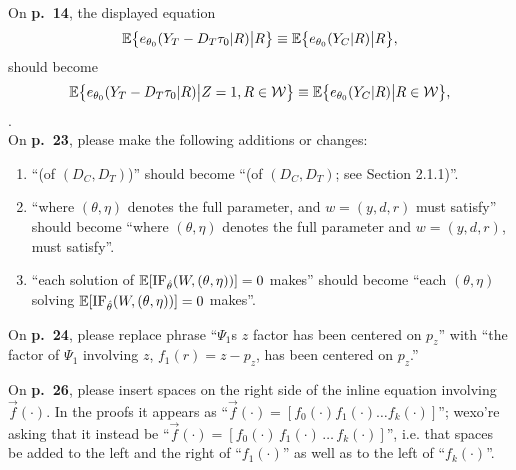 \documentclass[12pt]{article}
\begin{document}
On \textbf{p.~14}, the displayed equation  
\begin{equation*} %
\EE \big\{\dt[\thetaInf]{Y_T-D_T\tau_0}{ R } \big| R \big\}
\equiv \EE \big\{ \dt[\thetaInf]{Y_{C}}{ R } \big| R \big\},
\end{equation*}
should become 
\begin{equation*} %
\EE \big\{\dt[\thetaInf]{Y_T-D_T\tau_0}{ R } \big| Z=1, R \in \mathcal{W}\big\}
\equiv \EE \big\{ \dt[\thetaInf]{Y_{C}}{ R } \big| R \in \mathcal{W} \big\},
\end{equation*}
.\\

On \textbf{p.~23}, please make the following additions or changes:
\begin{enumerate}
\item ``(of $(D_C, D_T)$)'' should become ``(of $(D_C, D_T)$; see
  Section 2.1.1)''.
\item ``where $(\theta, \eta)$ denotes the full parameter, and $w =
({y},d,r)$ must satisfy'' should become ``where $(\theta, \eta)$
denotes the full parameter and $w = ({y},d,r)$, must satisfy''.
\item ``each solution of $\mathbb{E}[\mathrm{IF}_{\hat\theta}(W, (\theta, \eta))] =0$ makes''
  should become ``each $(\theta, \eta)$ solving $\mathbb{E}[\mathrm{IF}_{\hat\theta}(W, (\theta, \eta))] =0$
  makes''. 
\end{enumerate}

On \textbf{p.~24}, please replace phrase
   ``$\Psi_1$s $z$ factor has been centered on $p_z$''  with ``the factor of $\Psi_1$ involving $z$,
   $f_1(r) = z - p_{z}$, has been centered on $p_z$.''

On \textbf{p.~26}, please insert spaces on the right side of the
inline equation involving $\vec{f}(\cdot)$.  In the proofs it appears
as ``$\vec{f}(\cdot) = [f_{0}(\cdot) f_{1}(\cdot) \ldots
f_{k}(\cdot)]$''; wexo're asking that it instead be
``$\vec{f}(\cdot)=[f_{0}(\cdot)\, f_{1}(\cdot)\, \ldots\,
f_{k}(\cdot)]$'', i.e. that spaces be added to the left and the right
of ``$f_{1}(\cdot)$'' as well as to the left of ``$f_{k}(\cdot)$''.
\end{document}

